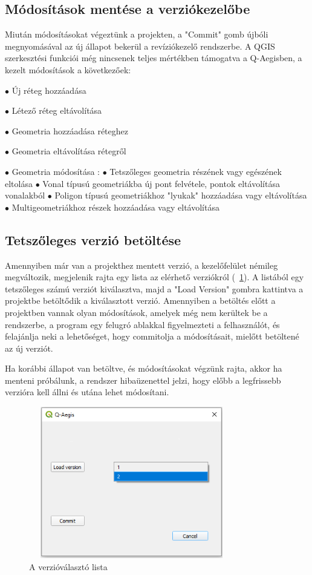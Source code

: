 \subsection{Módosítások mentése a verziókezelőbe}
Miután módosításokat végeztünk a projekten, a "Commit" gomb újbóli megnyomásával az új állapot bekerül a revíziókezelő rendszerbe. A QGIS szerkesztési funkciói még nincsenek teljes mértékben támogatva a Q-Aegisben, a kezelt módosítások a következőek:
\begin{list}{}{}
	\item $\bullet$ Új réteg hozzáadása
	\item $\bullet$ Létező réteg eltávolítása
	\item $\bullet$ Geometria hozzáadása réteghez
	\item $\bullet$ Geometria eltávolítása rétegről
	\item $\bullet$ Geometria módosítása :
		\subitem $\bullet$ Tetszőleges geometria részének vagy egészének eltolása
		\subitem $\bullet$ Vonal típusú geometriákba új pont felvétele, pontok eltávolítása vonalakból
		\subitem $\bullet$ Poligon típusú geometriákhoz "lyukak" hozzáadása vagy eltávolítása
		\subitem $\bullet$ Multigeometriákhoz részek hozzáadása vagy eltávolítása
\end{list}

\subsection{Tetszőleges verzió betöltése}
Amennyiben már van a projekthez mentett verzió, a kezelőfelület némileg megváltozik, megjelenik rajta egy lista az elérhető verziókról (~\ref{fig:picture-4}). A listából egy tetszőleges számú verziót kiválasztva, majd a "Load Version" gombra kattintva a projektbe betöltődik a kiválasztott verzió. Amennyiben a betöltés előtt a projektben vannak olyan módosítások, amelyek még nem kerültek be a rendszerbe, a program egy felugró ablakkal figyelmezteti a felhasználót, és felajánlja neki a lehetőséget, hogy commitolja a módosításait, mielőtt betöltené az új verziót.

Ha korábbi állapot van betöltve, és módosításokat végzünk rajta, akkor ha menteni próbálunk, a rendszer hibaüzenettel jelzi, hogy előbb a legfrissebb verzióra kell állni és utána lehet módosítani.
\begin{figure}[H]
	\centering
	\includegraphics[width=0.8\textwidth,height=250px]{images/available_versions.png}
	\caption{A verzióválasztó lista}
	\label{fig:picture-4}
\end{figure}

